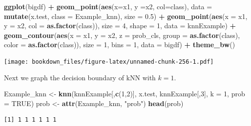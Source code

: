 \documentclass[
]{krantz}
\makeatletter
\newenvironment{Shaded}{\begin{snugshade}}{\end{snugshade}}
\newcommand{\DataTypeTok}[1]{\textcolor[rgb]{0.27,0.27,0.27}{#1}}
\newcommand{\DecValTok}[1]{\textcolor[rgb]{0.06,0.06,0.06}{#1}}
\newcommand{\FloatTok}[1]{\textcolor[rgb]{0.06,0.06,0.06}{#1}}
\newcommand{\KeywordTok}[1]{\textcolor[rgb]{0.27,0.27,0.27}{\textbf{#1}}}
\newcommand{\NormalTok}[1]{#1}
\newcommand{\OperatorTok}[1]{\textcolor[rgb]{0.43,0.43,0.43}{\textbf{#1}}}
\newcommand{\OtherTok}[1]{\textcolor[rgb]{0.37,0.37,0.37}{#1}}
\newcommand{\StringTok}[1]{\textcolor[rgb]{0.5,0.5,0.5}{#1}}
\newenvironment{kframe}{%
\medskip{}
\setlength{\fboxsep}{.8em}
 \def\at@end@of@kframe{}%
 \ifinner\ifhmode%
  \def\at@end@of@kframe{\end{minipage}}%
  \begin{minipage}{\columnwidth}%
 \fi\fi%
 \def\FrameCommand##1{\hskip\@totalleftmargin \hskip-\fboxsep
 \colorbox{shadecolor}{##1}\hskip-\fboxsep
     \hskip-\linewidth \hskip-\@totalleftmargin \hskip\columnwidth}%
 \MakeFramed {\advance\hsize-\width
   \@totalleftmargin\z@ \linewidth\hsize
   \@setminipage}}%
 {\par\unskip\endMakeFramed%
 \at@end@of@kframe}
\renewenvironment{Shaded}{\begin{kframe}}{\end{kframe}}
\makeatother
\begin{document}
\begin{Shaded}
\begin{Highlighting}[]
\KeywordTok{ggplot}\NormalTok{(bigdf) }\OperatorTok{+}\StringTok{ }
\StringTok{   }\KeywordTok{geom\_point}\NormalTok{(}\KeywordTok{aes}\NormalTok{(}\DataTypeTok{x=}\NormalTok{x1, }\DataTypeTok{y =}\NormalTok{x2, }\DataTypeTok{col=}\NormalTok{class), }\DataTypeTok{data =} \KeywordTok{mutate}\NormalTok{(x.test, }\DataTypeTok{class =}\NormalTok{ Example\_knn), }\DataTypeTok{size =} \FloatTok{0.5}\NormalTok{) }\OperatorTok{+}\StringTok{ }
\StringTok{   }\KeywordTok{geom\_point}\NormalTok{(}\KeywordTok{aes}\NormalTok{(}\DataTypeTok{x =}\NormalTok{ x1, }\DataTypeTok{y =}\NormalTok{ x2, }\DataTypeTok{col =} \KeywordTok{as.factor}\NormalTok{(class)), }\DataTypeTok{size =} \DecValTok{4}\NormalTok{, }\DataTypeTok{shape =} \DecValTok{1}\NormalTok{, }\DataTypeTok{data =}\NormalTok{ knnExample) }\OperatorTok{+}\StringTok{ }
\StringTok{   }\KeywordTok{geom\_contour}\NormalTok{(}\KeywordTok{aes}\NormalTok{(}\DataTypeTok{x =}\NormalTok{ x1, }\DataTypeTok{y =}\NormalTok{ x2, }\DataTypeTok{z =}\NormalTok{ prob\_cls, }\DataTypeTok{group =} \KeywordTok{as.factor}\NormalTok{(class), }\DataTypeTok{color =} \KeywordTok{as.factor}\NormalTok{(class)), }\DataTypeTok{size =} \DecValTok{1}\NormalTok{, }\DataTypeTok{bins =} \DecValTok{1}\NormalTok{, }\DataTypeTok{data =}\NormalTok{ bigdf) }\OperatorTok{+}\StringTok{ }\KeywordTok{theme\_bw}\NormalTok{()}
\end{Highlighting}
\end{Shaded}

\texttt{[image: bookdown\_files/figure-latex/unnamed-chunk-256-1.pdf]}

Next we graph the decision boundary of kNN with \(k=1\).

\begin{Shaded}
\begin{Highlighting}[]
\NormalTok{Example\_knn \textless{}{-}}\StringTok{ }\KeywordTok{knn}\NormalTok{(knnExample[,}\KeywordTok{c}\NormalTok{(}\DecValTok{1}\NormalTok{,}\DecValTok{2}\NormalTok{)], x.test, knnExample[,}\DecValTok{3}\NormalTok{], }\DataTypeTok{k =} \DecValTok{1}\NormalTok{, }\DataTypeTok{prob =} \OtherTok{TRUE}\NormalTok{)}
\NormalTok{prob \textless{}{-}}\StringTok{ }\KeywordTok{attr}\NormalTok{(Example\_knn, }\StringTok{"prob"}\NormalTok{)}
\KeywordTok{head}\NormalTok{(prob)}
\end{Highlighting}
\end{Shaded}

\begin{verbatim}
[1] 1 1 1 1 1 1
\end{verbatim}
\end{document}
